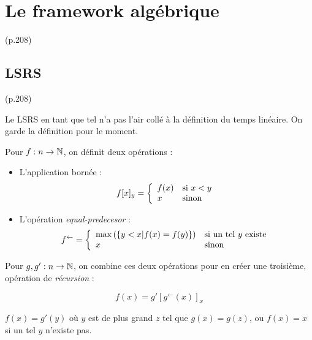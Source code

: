 \documentclass{report}
\newcommand{\eqpred}[3]{#1\left[ #2^{\leftarrow}(#3) \right]_{#3}}
\begin{document}
		
		
	\section{Le framework algébrique} (p.208)
		\label{sec:framework_algebrique}

		\subsection{LSRS} (p.208)
			\label{subsec:LSRS}
		
		Le LSRS en tant que tel n'a pas l'air collé à la définition du temps linéaire. On garde la définition pour le moment.

		\begin{definition}
			\label{def:app_bornee_eq_pred}
			Pour $f : n \to \mathbb{N}$, on définit deux opérations :
			
			\begin{itemize}
				\item 	L'application bornée :
				\[
				f[x]_y = \left\lbrace \begin{array}{ll} 
					f(x) & \text{si $x<y$} \\
					x 	& \text{sinon}
				 \end{array} \right.
				\]
				
				\item 	L'opération \emph{equal-predecesor} :
				\[
				f^{\leftarrow} = \left\lbrace \begin{array}{ll} 
					\max\left(\left\lbrace y < x | f(x) = f(y)\right\rbrace\right) & \text{si un tel $y$ existe} \\
					x	& \text{sinon}
				 \end{array} \right.
				\]
			\end{itemize}
			
			Pour $g, g' : n \to \mathbb{N}$, on combine ces deux opérations pour en créer une troisième, opération de \emph{récursion} :
			
			\[
			f(x) = \eqpred{g'}{g}{x}
			\]
			
			$f(x) = g'(y)$ où $y$ est de plus grand $z$ tel que $g(x) = g(z)$, ou $f(x) = x$ si un tel $y$ n'existe pas.
		\end{definition}
		
\end{document}
